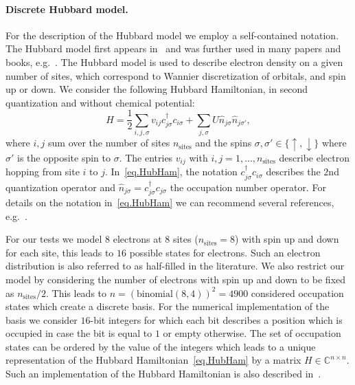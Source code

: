 \documentclass[smallextended]{svjour3pre}%
\numberwithin{equation}{section}
\numberwithin{figure}{section}
\numberwithin{table}{section}
\newcommand{\C}{\mathbb C}%
\newcommand\nsit{n_{\text{sites}}}
\begin{document}
\paragraph{Discrete Hubbard model.}
For the description of the Hubbard model we employ a self-contained notation.
The Hubbard model first appears in~\cite{hubbard63} and was further used in many papers and books, e.g.~\cite{Ma93,PKBS16}.
The Hubbard model is used to describe electron density on a given number of sites, which correspond to Wannier discretization of orbitals,
and spin up or down.
We consider the following Hubbard Hamiltonian, in second quantization and without chemical potential:
\begin{equation}\label{eq.HubHam}
H=\frac{1}{2} \sum_{i,j,\sigma} v_{ij} c_{j\sigma}^{\dagger} c_{i\sigma}
+ \sum_{j,\sigma} U \hat{n}_{j\sigma}\hat{n}_{j\sigma'},
\end{equation}
where $i,j$ sum over the number of sites $\nsit$ and the spins $\sigma,\sigma' \in\{\uparrow,\downarrow \}$ where $\sigma'$ is the opposite spin to $\sigma$.
The entries $v_{ij}$ with $i,j=1,\ldots,\nsit$ describe electron hopping from site $i$ to $j$.
In~\eqref{eq.HubHam}, the notation $c_{j\sigma}^\dagger c_{i\sigma}$ describes the $2$nd quantization operator
and $\hat{n}_{j\sigma}=c_{j\sigma}^\dagger c_{j\sigma}$ the occupation number operator.
For details on the notation in~\eqref{eq.HubHam} we can recommend several references, e.g.~\cite{hubbard63,Ja08,Ma93,PKBS16}.

For our tests we model $8$ electrons at $8$ sites ($\nsit=8$) with spin up and down for each site,
this leads to $16$ possible states for electrons.
Such an electron distribution is also referred to as half-filled in the literature.
We also restrict our model by considering the number of electrons with spin up and down to be fixed as $\nsit/2$.
This leads to $n=(\text{binomial}(8,4))^2=4900$ considered occupation states which create a discrete basis.
For the numerical implementation of the basis we consider $16$-bit integers
for which each bit describes a position which is occupied in case the bit is equal to $1$ or empty otherwise.
The set of occupation states can be ordered by the value of the integers which leads to a unique representation
of the Hubbard Hamiltonian~\eqref{eq.HubHam} by a matrix $H\in\C^{n\times n}$.
Such an implementation of the Hubbard Hamiltonian is also described in~\cite[Section 3]{Ja08}.
\end{document}
